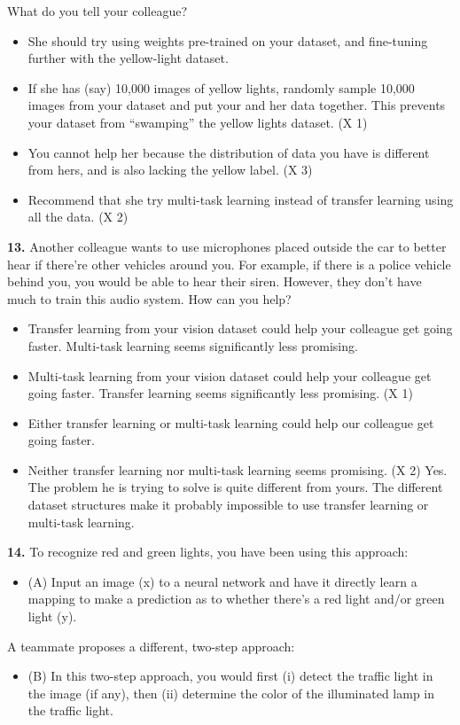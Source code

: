 What do you tell your colleague?
\begin{itemize}
    \item She should try using weights pre-trained on your dataset, and fine-tuning further with the yellow-light dataset.
    \item If she has (say) 10,000 images of yellow lights, randomly sample 10,000 images from your dataset and put your and her data together. This prevents your dataset from “swamping” the yellow lights dataset. (X 1)
    \item You cannot help her because the distribution of data you have is different from hers, and is also lacking the yellow label. (X 3)
    \item Recommend that she try multi-task learning instead of transfer learning using all the data. (X 2)
\end{itemize}
\textbf{13.} Another colleague wants to use microphones placed outside the car to better hear if there’re other vehicles around you. For example, if there is a police vehicle behind you, you would be able to hear their siren. However, they don’t have much to train this audio system. How can you help?
\begin{itemize}
    \item Transfer learning from your vision dataset could help your colleague get going faster. Multi-task learning seems significantly less promising.
    \item Multi-task learning from your vision dataset could help your colleague get going faster. Transfer learning seems significantly less promising. (X 1)
    \item Either transfer learning or multi-task learning could help our colleague get going faster.
    \item Neither transfer learning nor multi-task learning seems promising. (X 2) Yes. The problem he is trying to solve is quite different from yours. The different dataset structures make it probably impossible to use transfer learning or multi-task learning.
\end{itemize}
\textbf{14.} To recognize red and green lights, you have been using this approach:
\begin{itemize}
    \item (A) Input an image (x) to a neural network and have it directly learn a mapping to make a prediction as to whether there’s a red light and/or green light (y).
\end{itemize}
A teammate proposes a different, two-step approach:
\begin{itemize}
    \item (B) In this two-step approach, you would first (i) detect the traffic light in the image (if any), then (ii) determine the color of the illuminated lamp in the traffic light.
\end{itemize}
